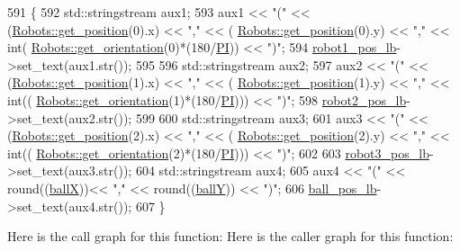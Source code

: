 \begin{DoxyCode}
591                                          \{
592         std::stringstream aux1;
593         aux1 << \textcolor{stringliteral}{"("} << (\hyperlink{class_robots_a1fca8f2f5070176faa6ba1efa2f1ff14}{Robots::get\_position}(0).x) << \textcolor{stringliteral}{","} << (
      \hyperlink{class_robots_a1fca8f2f5070176faa6ba1efa2f1ff14}{Robots::get\_position}(0).y) << \textcolor{stringliteral}{","} << \textcolor{keywordtype}{int}(
      \hyperlink{class_robots_ae1d0829c1089322c8fac5830f65b13a0}{Robots::get\_orientation}(0)*(180/\hyperlink{camcap_8hpp_a598a3330b3c21701223ee0ca14316eca}{PI})) << \textcolor{stringliteral}{")"};
594         \hyperlink{class_v_s_s_s___g_u_i_1_1_v4_l_interface_a568a4223fbff21740c879e612f903bf8}{robot1\_pos\_lb}->set\_text(aux1.str());
595 
596         std::stringstream aux2;
597         aux2 << \textcolor{stringliteral}{"("} << (\hyperlink{class_robots_a1fca8f2f5070176faa6ba1efa2f1ff14}{Robots::get\_position}(1).x) << \textcolor{stringliteral}{","} << (
      \hyperlink{class_robots_a1fca8f2f5070176faa6ba1efa2f1ff14}{Robots::get\_position}(1).y) << \textcolor{stringliteral}{","} << \textcolor{keywordtype}{int}((
      \hyperlink{class_robots_ae1d0829c1089322c8fac5830f65b13a0}{Robots::get\_orientation}(1)*(180/\hyperlink{camcap_8hpp_a598a3330b3c21701223ee0ca14316eca}{PI}))) << \textcolor{stringliteral}{")"};
598         \hyperlink{class_v_s_s_s___g_u_i_1_1_v4_l_interface_a4401b4de30c4134d0b4633fd84a72c69}{robot2\_pos\_lb}->set\_text(aux2.str());
599 
600         std::stringstream aux3;
601         aux3 << \textcolor{stringliteral}{"("} << (\hyperlink{class_robots_a1fca8f2f5070176faa6ba1efa2f1ff14}{Robots::get\_position}(2).x) << \textcolor{stringliteral}{","} << (
      \hyperlink{class_robots_a1fca8f2f5070176faa6ba1efa2f1ff14}{Robots::get\_position}(2).y) << \textcolor{stringliteral}{","} <<  \textcolor{keywordtype}{int}((
      \hyperlink{class_robots_ae1d0829c1089322c8fac5830f65b13a0}{Robots::get\_orientation}(2)*(180/\hyperlink{camcap_8hpp_a598a3330b3c21701223ee0ca14316eca}{PI}))) << \textcolor{stringliteral}{")"};
602 
603         \hyperlink{class_v_s_s_s___g_u_i_1_1_v4_l_interface_af1ed96270d6374c90adfe86c37b1da3a}{robot3\_pos\_lb}->set\_text(aux3.str());
604         std::stringstream aux4;
605         aux4 << \textcolor{stringliteral}{"("} << round((\hyperlink{class_v_s_s_s___g_u_i_1_1_v4_l_interface_a41a7395305cf41b91cdadee1f6c4d94b}{ballX}))<< \textcolor{stringliteral}{","} << round((\hyperlink{class_v_s_s_s___g_u_i_1_1_v4_l_interface_af81f6cd160e4b1331cbbec6f907c2856}{ballY})) << \textcolor{stringliteral}{")"};
606         \hyperlink{class_v_s_s_s___g_u_i_1_1_v4_l_interface_a878e9b2389e2fd084c51dfe7531dd7a8}{ball\_pos\_lb}->set\_text(aux4.str());
607     \}
\end{DoxyCode}
Here is the call graph for this function\+:
Here is the caller graph for this function\+:



